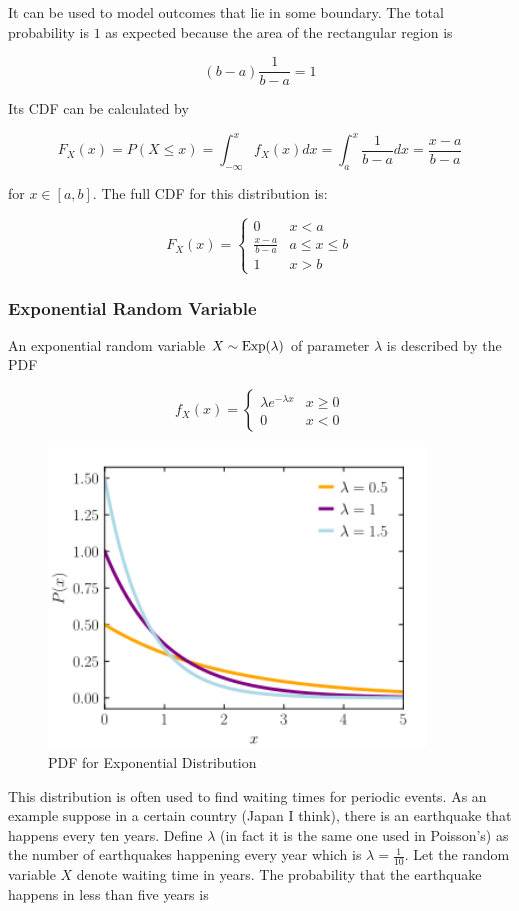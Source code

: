 It can be used to model outcomes that lie in some boundary. The total probability is $1$ as expected because the area of the rectangular region is

$$(b-a)\frac{1}{b-a}=1$$

Its CDF can be calculated by

\[F_X(x)=P(X\le x)=\int_{-\infty}^x f_X(x) dx = \int_a^x \frac{1}{b-a} dx = \frac{x-a}{b-a}\]

for $x\in[a,b]$. The full CDF for this distribution is:

\[F_X(x)=\begin{cases} 0 & x<a \\ \frac{x-a}{b-a} & a\le x \le b \\ 1 & x>b \end{cases}\]

\subsubsection{Exponential Random Variable}

An exponential random variable $X\sim\operatorname{Exp}(\lambda)$ of parameter $\lambda$ is described by the PDF

$$
f_X(x)=\begin{cases}
	\lambda  e^{-\lambda x} & x \ge 0 \\
	0 & x < 0
\end{cases}
$$

\begin{figure}[H]
	\centering
	\includegraphics[width=100mm]{14.png}
	\caption{PDF for Exponential Distribution}
\end{figure}

This distribution is often used to find waiting times for periodic events. As an example suppose in a certain country (Japan I think), there is an earthquake that happens every ten years. Define $\lambda$ (in fact it is the same one used in Poisson's) as the number of earthquakes happening every year which is $\lambda=\frac{1}{10}$. Let the random variable $X$ denote waiting time in years. The probability that the earthquake happens in less than five years is

